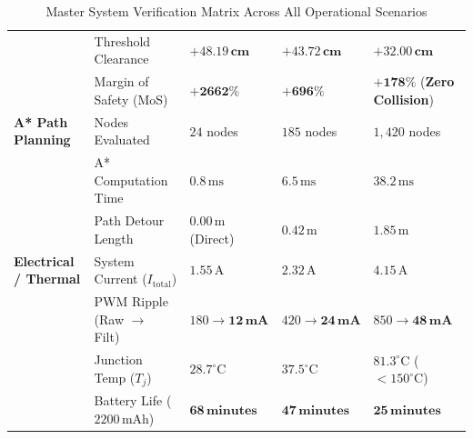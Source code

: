 \documentclass[11pt, a4paper]{article}
\begin{document}
\begin{table}[H]
\begin{tabularx}{\textwidth}{L{3.2cm} L{3.0cm} Y Y Y}
& Threshold Clearance & $\mathbf{+48.19\,\text{cm}}$ & $\mathbf{+43.72\,\text{cm}}$ & $\mathbf{+32.00\,\text{cm}}$ \\
& Margin of Safety (MoS) & $\mathbf{+2662\%}$ & $\mathbf{+696\%}$ & $\mathbf{+178\%}$ (\textbf{Zero Collision}) \\
\midrule
\textbf{A* Path Planning} & Nodes Evaluated & $24$ nodes & $185$ nodes & $1,420$ nodes \\
& A* Computation Time & $0.8\,\text{ms}$ & $6.5\,\text{ms}$ & $38.2\,\text{ms}$ \\
& Path Detour Length & $0.00\,\text{m}$ (Direct) & $0.42\,\text{m}$ & $1.85\,\text{m}$ \\
\midrule
\textbf{Electrical / Thermal} & System Current ($I_{\text{total}}$) & $1.55\,\text{A}$ & $2.32\,\text{A}$ & $4.15\,\text{A}$ \\
& PWM Ripple (Raw $\to$ Filt) & $180 \to \mathbf{12\,\text{mA}}$ & $420 \to \mathbf{24\,\text{mA}}$ & $850 \to \mathbf{48\,\text{mA}}$ \\
& Junction Temp ($T_j$) & $28.7^\circ\text{C}$ & $37.5^\circ\text{C}$ & $81.3^\circ\text{C}$ ($< 150^\circ\text{C}$) \\
& Battery Life ($2200\,\text{mAh}$) & $\mathbf{68\,\text{minutes}}$ & $\mathbf{47\,\text{minutes}}$ & $\mathbf{25\,\text{minutes}}$ \\
\bottomrule
\end{tabularx}
\caption{Master System Verification Matrix Across All Operational Scenarios}
\label{tab:master_benchmark}
\end{table}
\end{document}

